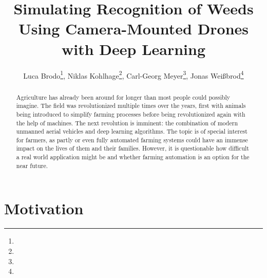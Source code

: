 \documentclass[english]{lni}
\begin{document}
\title[Simulating Recognition of Weeds Using Camera-Mounted Drones with Deep Learning]{Simulating Recognition of Weeds Using Camera-Mounted Drones with Deep Learning}
\author[Group 1]{Luca Brodo\footnote{ }, Niklas Kohlhage\footnote{ }, Carl-Georg Meyer\footnote{ }, Jonas Weißbrod\footnote{ } }

\maketitle
\tableofcontents
\begin{abstract}
Agriculture has already been around for longer than most people could possibly imagine. The field was revolutionized multiple times over the years, first with animals being introduced to simplify farming processes before being revolutionized again with the help of machines. The next revolution is imminent: the combination of modern unmanned aerial vehicles and deep learning algorithms. The topic is of special interest for farmers, as partly or even fully automated farming systems could have an immense impact on the lives of them and their families. However, it is questionable how difficult a real world application might be and whether farming automation is an option for the near future.
\end{abstract}

\newpage

\section{Motivation}
\end{document}
